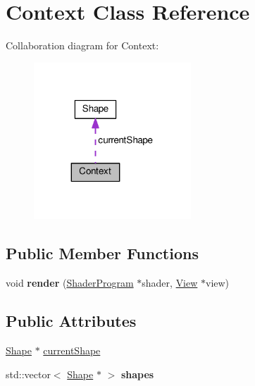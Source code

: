 \hypertarget{classContext}{}\section{Context Class Reference}
\label{classContext}


Collaboration diagram for Context\+:\nopagebreak
\begin{figure}[H]
\begin{center}
\leavevmode
\includegraphics[width=167pt]{classContext__coll__graph}
\end{center}
\end{figure}
\subsection*{Public Member Functions}
\begin{DoxyCompactItemize}
\item 
void {\bfseries render} (\hyperlink{classShaderProgram}{Shader\+Program} $\ast$shader, \hyperlink{classView}{View} $\ast$view)\hypertarget{classContext_a30f4ecb566d47094a9292e33d7c19331}{}\label{classContext_a30f4ecb566d47094a9292e33d7c19331}

\end{DoxyCompactItemize}
\subsection*{Public Attributes}
\begin{DoxyCompactItemize}
\item 
\hyperlink{classShape}{Shape} $\ast$ \hyperlink{classContext_a8c5402128ba3105635ac7d14353d934a}{current\+Shape}
\item 
std\+::vector$<$ \hyperlink{classShape}{Shape} $\ast$ $>$ {\bfseries shapes}\hypertarget{classContext_a7b52a567fdb294c04d208ad46646bd1c}{}\label{classContext_a7b52a567fdb294c04d208ad46646bd1c}

\end{DoxyCompactItemize}


